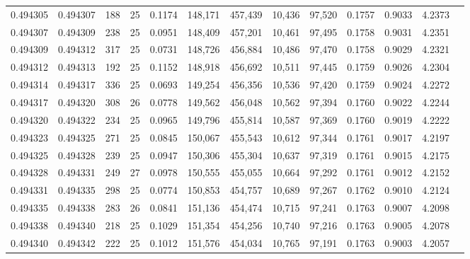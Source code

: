 \begin{tabular}{rrrrrrrrrrrrr}
0.494305 & 0.494307 & 188 &  25 &                                     0.1174 & 148,171 & 457,439 &  10,436 &  97,520 & 0.1757 & 0.9033 & 4.2373 \\
0.494307 & 0.494309 & 238 &  25 &                                     0.0951 & 148,409 & 457,201 &  10,461 &  97,495 & 0.1758 & 0.9031 & 4.2351 \\
0.494309 & 0.494312 & 317 &  25 &                                     0.0731 & 148,726 & 456,884 &  10,486 &  97,470 & 0.1758 & 0.9029 & 4.2321 \\
0.494312 & 0.494313 & 192 &  25 &                                     0.1152 & 148,918 & 456,692 &  10,511 &  97,445 & 0.1759 & 0.9026 & 4.2304 \\
0.494314 & 0.494317 & 336 &  25 &                                     0.0693 & 149,254 & 456,356 &  10,536 &  97,420 & 0.1759 & 0.9024 & 4.2272 \\
0.494317 & 0.494320 & 308 &  26 &                                     0.0778 & 149,562 & 456,048 &  10,562 &  97,394 & 0.1760 & 0.9022 & 4.2244 \\
0.494320 & 0.494322 & 234 &  25 &                                     0.0965 & 149,796 & 455,814 &  10,587 &  97,369 & 0.1760 & 0.9019 & 4.2222 \\
0.494323 & 0.494325 & 271 &  25 &                                     0.0845 & 150,067 & 455,543 &  10,612 &  97,344 & 0.1761 & 0.9017 & 4.2197 \\
0.494325 & 0.494328 & 239 &  25 &                                     0.0947 & 150,306 & 455,304 &  10,637 &  97,319 & 0.1761 & 0.9015 & 4.2175 \\
0.494328 & 0.494331 & 249 &  27 &                                     0.0978 & 150,555 & 455,055 &  10,664 &  97,292 & 0.1761 & 0.9012 & 4.2152 \\
0.494331 & 0.494335 & 298 &  25 &                                     0.0774 & 150,853 & 454,757 &  10,689 &  97,267 & 0.1762 & 0.9010 & 4.2124 \\
0.494335 & 0.494338 & 283 &  26 &                                     0.0841 & 151,136 & 454,474 &  10,715 &  97,241 & 0.1763 & 0.9007 & 4.2098 \\
0.494338 & 0.494340 & 218 &  25 &                                     0.1029 & 151,354 & 454,256 &  10,740 &  97,216 & 0.1763 & 0.9005 & 4.2078 \\
0.494340 & 0.494342 & 222 &  25 &                                     0.1012 & 151,576 & 454,034 &  10,765 &  97,191 & 0.1763 & 0.9003 & 4.2057 \\

\end{tabular}
